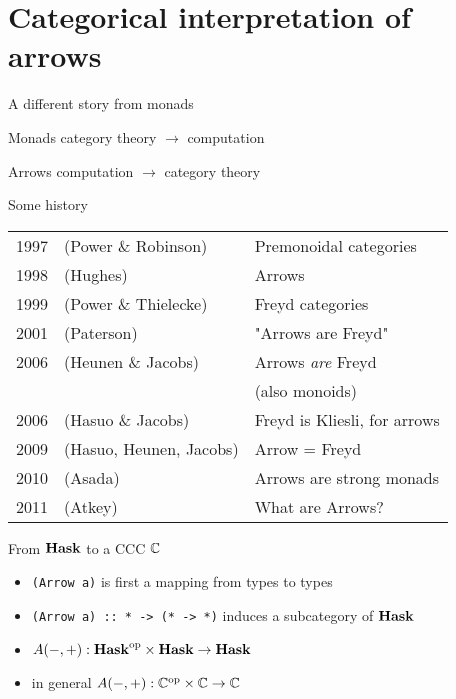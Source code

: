 \section{Categorical interpretation of arrows}

\frame{\tableofcontents[currentsection]}

\begin{frame}
\begin{center}\Large A different story from monads \end{center}
    \begin{itemeyez}
        \item[Monads] category theory $\to$ computation
        \item[ ]
        \item[Arrows] computation $\to$ category theory
    \end{itemeyez}
\end{frame}

\begin{frame}
\begin{center}\Large Some history\end{center}
    \begin{tabular}{rll}
        1997 & (Power \& Robinson) & Premonoidal categories \\
        1998 & (Hughes)  & Arrows \\
        1999 & (Power \& Thielecke) & Freyd categories \\
        2001 & (Paterson) & "Arrows are Freyd" \\
        2006 & (Heunen \& Jacobs) & Arrows \emph{are} Freyd\\
                                & & (also monoids) \\
        2006 & (Hasuo \& Jacobs) & Freyd is Kliesli, for arrows \\
        2009 & (Hasuo, Heunen, Jacobs) & Arrow = Freyd \\
        2010 & (Asada) & Arrows are strong monads\\
        2011 & (Atkey) & What are Arrows?
    \end{tabular}
\end{frame}

\begin{frame}[fragile]
\begin{center}\Large From $\mathbf{Hask}$ to a CCC $\mathbb{C}$\end{center}
    \begin{itemize}
        \item \verb|(Arrow a)| is first a mapping from types to types
        \item \verb|(Arrow a) :: * -> (* -> *)| induces a subcategory of $\mathbf{Hask}$
        \item $A(-, +): {\mathbf{Hask}}^{\text{op}} \times \mathbf{Hask} \to \mathbf{Hask}$
        \item in general $A(-, +): {\mathbb{C}}^{\text{op}} \times \mathbb{C} \to \mathbb{C}$
    \end{itemize}
\end{frame}

